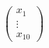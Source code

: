 \documentclass[preview]{standalone}
\begin{document}
\begin{align*}
\begin{pmatrix} x_1\\ \vdots\\ x_{10} \end{pmatrix}
\end{align*}
\end{document}
